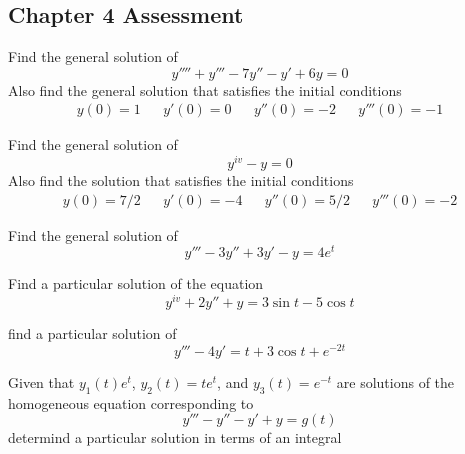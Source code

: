 \begin{multicols*}{2}
\section{Chapter 4 Assessment}
	
	\begin{q}
		Find the general solution of \[ y'''' + y''' - 7y'' - y' + 6y = 0 \]
		Also find the general solution that satisfies the initial conditions 
		\begin{align*}
		y(0)=1 && y'(0) = 0 && y''(0) = -2 && y'''(0) = -1
		\end{align*}
	\end{q}
	\begin{q}
		Find the general solution of \[ y^{iv} - y = 0 \] Also find the solution that satisfies the initial conditions 
		\begin{align*}
		y(0) = 7/2 && y'(0) = -4 && y''(0)= 5/2 && y'''(0) = -2
		\end{align*}
	\end{q}
	\begin{q}
		Find the general solution of \[ y''' - 3y'' + 3y' - y = 4e^t \]
	\end{q}
	\begin{q}
		Find a particular solution of the equation \[ y^{iv} + 2y'' + y = 3 \sin t - 5 \cos t \]
	\end{q}
	\begin{q}
		find a particular solution of \[ y''' - 4y' = t + 3 \cos t + e^{-2t} \]
	\end{q}
	\begin{q}
		Given that $ y_1(t) e^t$, $y_2(t) = t e^t $, and $ y_3(t)= e^{-t} $ are solutions of the homogeneous equation corresponding to \[ y''' - y'' - y' + y = g(t)  \] determind a particular solution in terms of an integral
	\end{q}
\end{multicols*}
